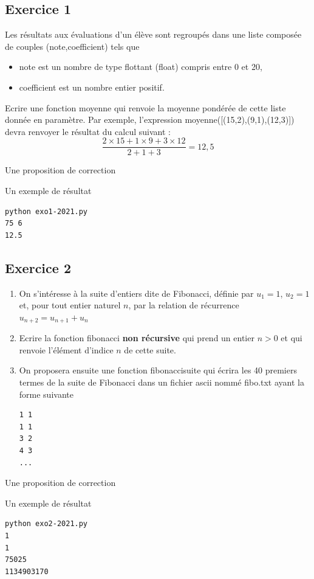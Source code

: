\documentclass[a4paper,12pt]{article}
\begin{document}
\subsection{Exercice 1}
\begin{leftbar}
Les r\'esultats aux \'evaluations d'un \'el\`eve sont regroup\'es dans une liste compos\'ee de couples (note,coefficient) tels que
\begin{itemize}
\item note est un nombre de type flottant (float) compris entre 0 et 20,
\item coefficient est un nombre entier positif.
\end{itemize}
Ecrire une fonction moyenne qui renvoie la moyenne pond\'er\'ee de cette liste donn\'ee en param\`etre. Par exemple, l'expression moyenne([(15,2),(9,1),(12,3)]) devra renvoyer le r\'esultat du calcul suivant :
\begin{equation*}
\displaystyle\frac{2\times 15+1\times 9+3\times 12}{2+1+3}=12,5
\end{equation*}
\end{leftbar}
Une proposition de correction

Un exemple de r\'esultat
\begin{verbatim}
python exo1-2021.py 
75 6
12.5
\end{verbatim}

\clearpage
\subsection{Exercice 2}
\begin{leftbar}
\begin{enumerate}
\item On s'int\'eresse \`a la suite d'entiers dite de Fibonacci, d\'efinie par
$u_1=1$, $u_2=1$ et, pour tout entier naturel $n$, par la relation de r\'ecurrence $u_{n+2}=u_{n+1}+u_n$
\item Ecrire la fonction fibonacci \textbf{non r\'ecursive} qui prend un entier $n > 0$ et qui renvoie l'\'el\'ement d'indice $n$ de cette suite.
\item On proposera ensuite une fonction fibonaccisuite qui \'ecrira les 40 premiers termes de la suite de Fibonacci dans un fichier ascii nomm\'e fibo.txt ayant la forme suivante
\begin{verbatim}
1 1
1 1
3 2
4 3
...
\end{verbatim}
\end{enumerate}
\end{leftbar}
Une proposition de correction

Un exemple de r\'esultat
\begin{verbatim}
python exo2-2021.py 
1
1
75025
1134903170
\end{verbatim}
\clearpage
\end{document}
